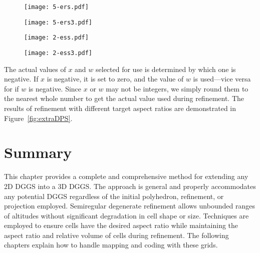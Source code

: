 \begin{figure*}[ht!]
	\centering
	\begin{subfigure}[]{0.25\textwidth}
		\centering
		\texttt{[image: 5-ers.pdf]}
		\caption{}
		\label{fig:ers1}
	\end{subfigure}%
	\begin{subfigure}[]{0.25\textwidth}
		\centering
		\texttt{[image: 5-ers3.pdf]}
		\caption{}
		\label{fig:ers3}
	\end{subfigure}%
	\begin{subfigure}[]{0.25\textwidth}
		\centering
		\texttt{[image: 2-ess.pdf]}
		\caption{}
		\label{fig:ess1}
	\end{subfigure}%
	\begin{subfigure}[]{0.25\textwidth}
		\centering
		\texttt{[image: 2-ess3.pdf]}
		\caption{}
		\label{fig:ess3}
	\end{subfigure}
	
	\caption[Prismatoid refinement modified to achieve different cell aspect ratios]{
		A demonstration of how refinement can be modified to affect the aspect ratio of cells.
		All figures show a starting pyramid cell from a grid with 200 cells in its initial discretization.
		Central layer with five extra radial splits ($a = 3$ to get $x = 5$) at (a) one level of refinement and (b) three levels.
		Central layer with two applications of the surface refinement scheme ($a = 1/8$ to get $w = 2$) at (c) one level of refinement and (d) three levels
	}
	\label{fig:extraDPS}
\end{figure*}


The actual values of $x$ and $w$ selected for use is determined by which one is negative.
If $x$ is negative, it is set to zero, and the value of $w$ is used---vice versa for if $w$ is negative.
Since $x$ or $w$ may not be integers, we simply round them to the nearest whole number to get the actual value used during refinement.
The results of refinement with different target aspect ratios are demonstrated in Figure~\ref{fig:extraDPS}.


\section{Summary}
This chapter provides a complete and comprehensive method for extending any 2D DGGS into a 3D DGGS.
The approach is general and properly accommodates any potential DGGS regardless of the initial polyhedron, refinement, or projection employed.
Semiregular degenerate refinement allows unbounded ranges of altitudes without significant degradation in cell shape or size.
Techniques are employed to ensure cells have the desired aspect ratio while maintaining the aspect ratio and relative volume of cells during refinement.
The following chapters explain how to handle mapping and coding with these grids. 
